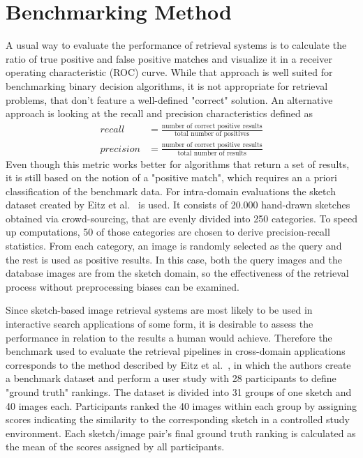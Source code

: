 \section{Benchmarking Method}\label{sec:results_benchmarking}

A usual way to evaluate the performance of retrieval systems is to calculate
the ratio of true positive and false positive matches and visualize it in a
receiver operating characteristic (ROC) curve. While that approach is well
suited for benchmarking binary decision algorithms, it is not appropriate for
retrieval problems, that don't feature a well-defined "correct" solution. An
alternative approach is looking at the recall and precision characteristics
defined as
\begin{align*}
    recall & = \frac{\text{number of correct positive results}}{\text{total number of positives}} \\
    precision & = \frac{\text{number of correct positive results}}{\text{total number of results}}
\end{align*}
Even though this metric works better for algorithms that return a set of
results, it is still based on the notion of a "positive match", which requires
an a priori classification of the benchmark data. For intra-domain evaluations
the sketch dataset created by Eitz et al.\ \autocite{eitz_how_2012} is used.
It consists of 20.000 hand-drawn sketches obtained via crowd-sourcing, that are
evenly divided into 250 categories. To speed up computations, 50 of those
categories are chosen to derive precision-recall statistics. From each
category, an image is randomly selected as the query and the rest is used as
positive results. In this case, both the query images and the database images
are from the sketch domain, so the effectiveness of the retrieval process
without preprocessing biases can be examined.

Since sketch-based image retrieval systems are most likely to be used in
interactive search applications of some form, it is desirable to assess the
performance in relation to the results a human would achieve.  Therefore the
benchmark used to evaluate the retrieval pipelines in cross-domain applications
corresponds to the method described by Eitz et al.\
\autocite{eitz_sketch-based_2010}, in which the authors create a benchmark
dataset and perform a user study with 28 participants to define "ground truth"
rankings. The dataset is divided into 31 groups of one sketch and 40 images
each. Participants ranked the 40 images within each group by assigning scores
indicating the similarity to the corresponding sketch in a controlled study
environment. Each sketch/image pair's final ground truth ranking is calculated
as the mean of the scores assigned by all participants.

